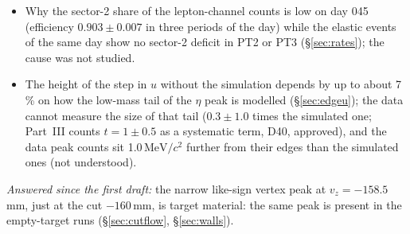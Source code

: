 \documentclass[11pt,a4paper]{article}
\newcommand{\MeVcc}{\ensuremath{\mathrm{MeV}/c^{2}}\xspace}
\newcommand{\vz}{\ensuremath{v_z}\xspace}
\begin{document}
\begin{itemize}
\item Why the sector-2 share of the lepton-channel counts is low on day 045 (efficiency $0.903\pm0.007$ in three periods of the day) while
      the elastic events of the same day show no sector-2 deficit in PT2 or PT3 (\S\ref{sec:rates}); the cause was not studied.
\item The height of the step in $u$ without the simulation depends by up to about 7\,\% on how the low-mass tail of the $\eta$ peak is
      modelled (\S\ref{sec:edgeu}); the data cannot measure the size of that tail ($0.3\pm1.0$ times the simulated one; Part~III counts $t=1\pm0.5$ as a systematic term, D40, approved),
      and the data peak counts sit 1.0\,\MeVcc further from their edges than the simulated ones (not understood).
\end{itemize}
\emph{Answered since the first draft:} the narrow like-sign vertex peak at $\vz=-158.5$\,mm, just at the cut $-160$\,mm, is target
material: the same peak is present in the empty-target runs (\S\ref{sec:cutflow}, \S\ref{sec:walls}).
\end{document}
